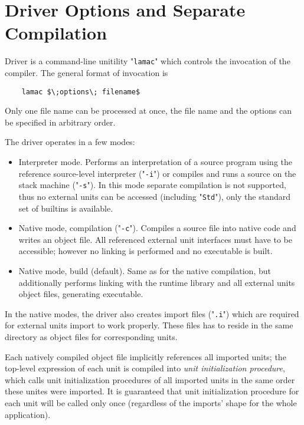 \chapter{Driver Options and Separate Compilation}
\label{sec:driver}

Driver is a command-line unitility "\texttt{lamac}" which controls the invocation of the compiler. The
general format of invocation is

\begin{lstlisting}
    lamac $\;options\; filename$
\end{lstlisting}

Only one file name can be processed at once, the file name and the options can be specified in
arbitrary order.

The driver operates in a few modes:

\begin{itemize}
\item Interpreter mode. Performs an interpretation of a source program using the reference source-level interpreter ("\texttt{-i}") or
  compiles and runs a source on the stack machine ("\texttt{-s}"). In this mode separate compilation is not supported, thus no external
  units can be accessed (including "\lstinline|Std|"), only the standard set of builtins is available. 
\item Native mode, compilation ("\lstinline{-c}"). Compiles a source file into native code and writes an object file. All referenced
  external unit interfaces must have to be accessible; however no linking is performed and no executable is built.
\item Native mode, build (default). Same as for the native compilation, but additionally performs linking with the runtime library and
  all external units object files, generating executable.
\end{itemize}

In the native modes, the driver also creates import files ("\texttt{.i}") which are required for external units import to
work properly. These files has to reside in the same directory as object files for corresponding units.

Each natively compiled object file implicitly references all imported units; the top-level expression of each
unit is compiled into \emph{unit initialization procedure}, which calls unit initialization procedures of
all imported units in the same order these unites were imported. It is guaranteed that unit initialization
procedure for each unit will be called only once (regardless of the imports' shape for the whole application).

